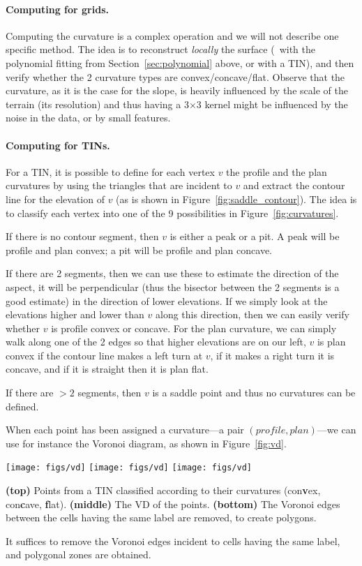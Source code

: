 \paragraph{Computing for grids.}
Computing the curvature is a complex operation and we will not describe one specific method.
The idea is to reconstruct \emph{locally} the surface (\eg\ with the polynomial fitting from Section~\ref{sec:polynomial} above, or with a TIN), and then verify whether the 2 curvature types are convex/concave/flat.
Observe that the curvature, as it is the case for the slope, is heavily influenced by the scale of the terrain (its resolution) and thus having a 3$\times$3 kernel might be influenced by the noise in the data, or by small features.


\paragraph{Computing for TINs.}
For a TIN, it is possible to define for each vertex $v$ the profile and the plan curvatures by using the triangles that are incident to $v$ and extract the contour line for the elevation of $v$ (as is shown in Figure~\ref{fig:saddle_contour}).
The idea is to classify each vertex into one of the 9 possibilities in Figure~\ref{fig:curvatures}.

If there is no contour segment, then $v$ is either a peak or a pit.
A peak will be profile and plan convex; a pit will be profile and plan concave.

If there are 2 segments, then we can use these to estimate the direction of the aspect, it will be perpendicular (thus the bisector between the 2 segments is a good estimate) in the direction of lower elevations.
If we simply look at the elevations higher and lower than $v$ along this direction, then we can easily verify whether $v$ is profile convex or concave.
For the plan curvature, we can simply walk along one of the 2 edges so that higher elevations are on our left, $v$ is plan convex if the contour line makes a left turn at $v$, if it makes a right turn it is concave, and if it is straight then it is plan flat.

If there are $>2$ segments, then $v$ is a saddle point and thus no curvatures can be defined.

%

When each point has been assigned a curvature---a pair $(profile,plan)$---we can use for instance the Voronoi diagram, as shown in Figure~\ref{fig:vd}.
\begin{marginfigure}
  \centering
  \texttt{[image: figs/vd]}
  \texttt{[image: figs/vd]}
  \texttt{[image: figs/vd]}
  \caption{\textbf{(top)} Points from a TIN classified according to their curvatures (con\textbf{v}ex, con\textbf{c}ave, \textbf{f}lat). \textbf{(middle)} The VD of the points. \textbf{(bottom)} The Voronoi edges between the cells having the same label are removed, to create polygons.}%
\label{fig:vd}
\end{marginfigure}
It suffices to remove the Voronoi edges incident to cells having the same label, and polygonal zones are obtained.


